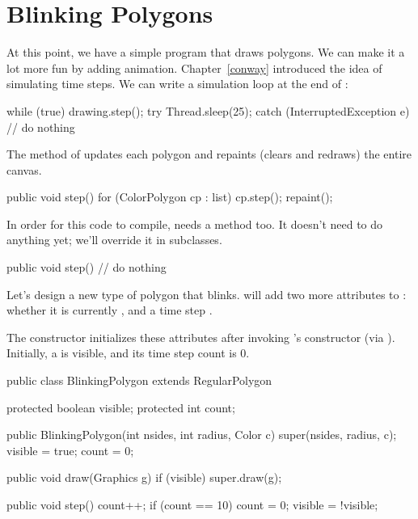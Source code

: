 

\section{Blinking Polygons}
\label{sec:blinking}

At this point, we have a simple program that draws polygons.
We can make it a lot more fun by adding animation.
Chapter~\ref{conway} introduced the idea of simulating time steps.
We can write a simulation loop at the end of :

\begin{code}
while (true) {
    drawing.step();
    try {
        Thread.sleep(25);
    } catch (InterruptedException e) {
        // do nothing
    }
}
\end{code}

The  method of  updates each polygon and repaints (clears and redraws) the entire canvas.

\begin{code}
public void step() {
    for (ColorPolygon cp : list) {
        cp.step();
    }
    repaint();
}
\end{code}

In order for this code to compile,  needs a  method too.
It doesn't need to do anything yet; we'll override it in subclasses.

\begin{code}
public void step() {
    // do nothing
}
\end{code}

Let's design a new type of polygon that blinks.
 will add two more attributes to : whether it is currently , and a time step .

The constructor initializes these attributes after invoking 's constructor (via ).
Initially, a  is visible, and its time step count is 0.

\begin{code}
public class BlinkingPolygon extends RegularPolygon {
    protected boolean visible;
    protected int count;

    public BlinkingPolygon(int nsides, int radius, Color c) {
        super(nsides, radius, c);
        visible = true;
        count = 0;
    }

    public void draw(Graphics g) {
        if (visible) {
            super.draw(g);
        }
    }

    public void step() {
        count++;
        if (count == 10) {
            count = 0;
            visible = !visible;
        }
    }
}
\end{code}

